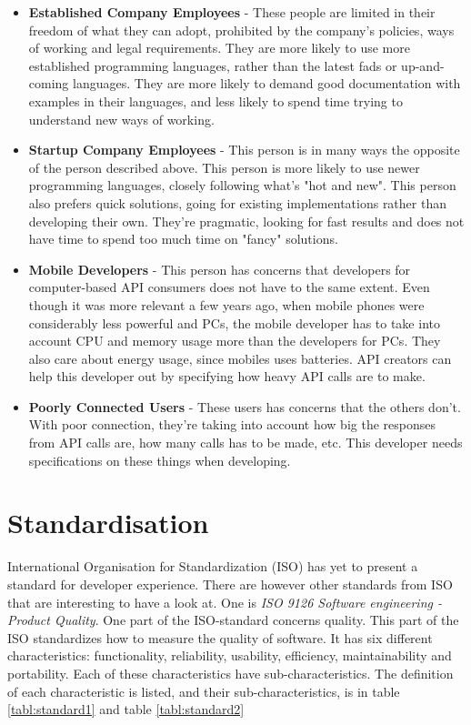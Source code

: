 \documentclass{cslthse-msc}
\begin{document}
    \begin{itemize}[label={}]
        \item \textbf{Established Company Employees} - These people are limited in their freedom of what they can adopt, prohibited by the company's policies, ways of working and legal requirements. They are more likely to use more established programming languages, rather than the latest fads or up-and-coming languages. They are more likely to demand good documentation with examples in their languages, and less likely to spend time trying to understand new ways of working.
        \item \textbf{Startup Company Employees} - This person is in many ways the opposite of the person described above. This person is more likely to use newer programming languages, closely following what's "hot and new". This person also prefers quick solutions, going for existing implementations rather than developing their own. They're pragmatic, looking for fast results and does not have time to spend too much time on "fancy" solutions.
        \item \textbf{Mobile Developers} - This person has concerns that developers for computer-based API consumers does not have to the same extent. Even though it was more relevant a few years ago, when mobile phones were considerably less powerful and PCs, the mobile developer has to take into account CPU and memory usage more than the developers for PCs. They also care about energy usage, since mobiles uses batteries. API creators can help this developer out by specifying how heavy API calls are to make.
        \item \textbf{Poorly Connected Users} - These users has concerns that the others don't. With poor connection, they're taking into account how big the responses from API calls are, how many calls has to be made, etc. This developer needs specifications on these things when developing.
    \end{itemize}


    \section{Standardisation}
    International Organisation for Standardization (ISO) has yet to present a
    standard for developer experience. There are however other standards from ISO
    that are interesting to have a look at. One is \textit{ISO 9126 Software engineering - Product Quality}.
    One part of the ISO-standard concerns quality. This part of the ISO standardizes how to measure the quality of software.
    It has six different characteristics: functionality, reliability, usability, efficiency, maintainability and
    portability. Each of these characteristics have sub-characteristics. The definition of each
    characteristic is listed, and their sub-characteristics, is in table \ref{tabl:standard1} and table \ref{tabl:standard2}
\end{document}
